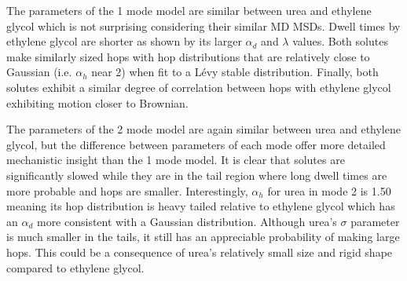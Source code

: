 \documentclass{article}
\begin{document}
  The parameters of the 1 mode model are similar between urea and ethylene glycol which 
  is not surprising considering their similar MD MSDs. Dwell times by 
  ethylene glycol are shorter as shown by its larger $\alpha_d$ and $\lambda$ values. Both
  solutes make similarly sized hops with hop distributions that are relatively close 
  to Gaussian (i.e. $\alpha_h$ near 2) when fit to a L\'evy stable distribution. Finally,
  both solutes exhibit a similar degree of correlation between hops with ethylene glycol
  exhibiting motion closer to Brownian. 
  
  The parameters of the 2 mode model are again similar between urea and ethylene glycol, 
  but the difference between parameters of each mode offer more detailed mechanistic
  insight than the 1 mode model. It is clear that solutes are significantly slowed while
  they are in the tail region where long dwell times are more probable and hops are 
  smaller. Interestingly, $\alpha_h$ for urea in mode 2 is 1.50 meaning its hop distribution is
  heavy tailed relative to ethylene glycol which has an $\alpha_d$ more consistent 
  with a Gaussian distribution. Although urea's $\sigma$ parameter is much smaller in 
  the tails, it still has an appreciable probability of making large hops. This could 
  be a consequence of urea's relatively small size and rigid shape compared to ethylene glycol.
  
\end{document}

